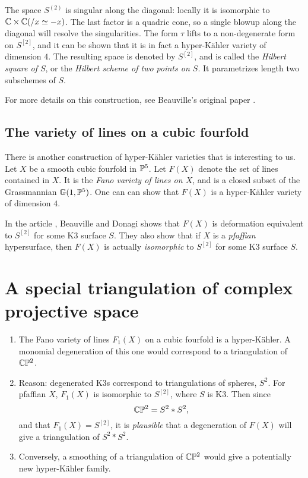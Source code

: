 The space $S^{(2)}$ is singular along the diagonal: locally it is isomorphic to $\C \times \C(/ x \simeq -x)$. The last factor is a quadric cone, so a single blowup along the diagonal will resolve the singularities. The form $\tau$ lifts to a non-degenerate form on $S^{[2]}$, and it can be shown that it is in fact a hyper-Kähler variety of dimension $4$. The resulting space is denoted by $S^{[2]}$, and is called the \emph{Hilbert square of $S$}, or the \emph{Hilbert scheme of two points on $S$}. It parametrizes length two subschemes of $S$.

For more details on this construction, see Beauville's original paper \cite{beauville_hyperkahler}.


\subsection{The variety of lines on a cubic fourfold}

There is another construction of hyper-Kähler varieties that is interesting to us. Let $X$ be a smooth cubic fourfold in $\P^5$. Let $F(X)$ denote the set of lines contained in $X$. It is the \emph{Fano variety of lines on $X$}, and is a closed subset of the Grassmannian $\mathbb G(1,\P^5)$. One can can show that $F(X)$ is a hyper-Kähler variety of dimension $4$.


In the article \cite{beauville_donagi_fano}, Beauville and Donagi shows that $F(X)$ is deformation equivalent to $S^{[2]}$ for some K3 surface $S$. They also show that if $X$ is a \emph{pfaffian} hypersurface, then $F(X)$ is actually \emph{isomorphic} to $S^{[2]}$ for some K3 surface $S$.



\section{A special triangulation of complex projective space}



\begin{enumerate}
	\item The Fano variety of lines $F_1(X)$ on a cubic fourfold is a hyper-Kähler. A monomial degeneration of this one would correspond to a triangulation of $\C \P ^2$.
	\item Reason: degenerated K3s correspond to triangulations of spheres, $S^2$. For pfaffian $X$, $F_1(X)$ is isomorphic to $S^{[2]}$, where $S$ is K3. Then since
	$$
	\C \P^2 = S^2 \ast S^2,
	$$
	and that $F_1(X) = S^{[2]}$, it is \emph{plausible} that a degeneration of $F(X)$ will give a triangulation of $S^2 \ast S^2$. 


	\item Conversely, a smoothing of a triangulation of $\C \P^2$ would give a potentially new hyper-Kähler family.
\end{enumerate}